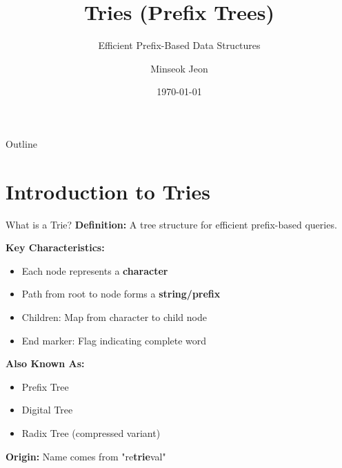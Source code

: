 \documentclass[aspectratio=169]{beamer}
\title{Tries (Prefix Trees)}
\subtitle{Efficient Prefix-Based Data Structures}
\author{Minseok Jeon}
\institute{DGIST}
\date{\today}
\begin{document}
\begin{frame}
  \titlepage
\end{frame}

\begin{frame}{Outline}
  \tableofcontents
\end{frame}

\section{Introduction to Tries}

\begin{frame}{What is a Trie?}
  \textbf{Definition:} A tree structure for efficient prefix-based queries.

  \vspace{0.3cm}
  \textbf{Key Characteristics:}
  \begin{itemize}
    \item Each node represents a \textbf{character}
    \item Path from root to node forms a \textbf{string/prefix}
    \item Children: Map from character to child node
    \item End marker: Flag indicating complete word
  \end{itemize}

  \vspace{0.3cm}
  \textbf{Also Known As:}
  \begin{itemize}
    \item Prefix Tree
    \item Digital Tree
    \item Radix Tree (compressed variant)
  \end{itemize}

  \vspace{0.3cm}
  \textbf{Origin:} Name comes from "re\textbf{trie}val"
\end{frame}
\end{document}
